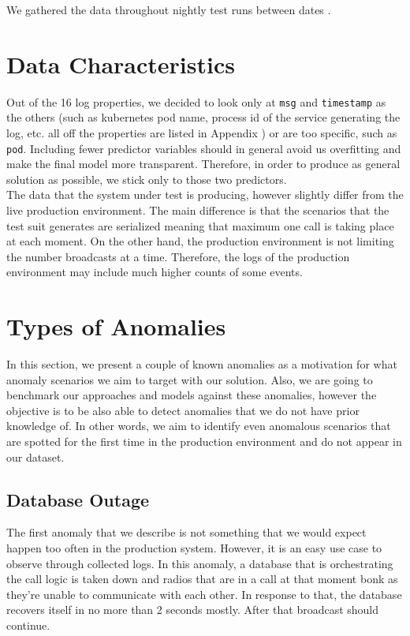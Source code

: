 We gathered the data throughout  nightly test runs between dates .


\section{Data Characteristics}
Out of the 16 log properties, we decided to look only at \texttt{msg} and \texttt{timestamp} as the others (such as kubernetes pod name, process id of the service generating the log, etc. all off the properties are listed in Appendix ) or are too specific, such as \texttt{pod}. 
Including fewer predictor variables should in general avoid us overfitting and make the final model more transparent.
Therefore, in order to produce as general solution as possible, we stick only to those two predictors.\\

The data that the system under test is producing, however slightly differ from the live production environment.
The main difference is that the scenarios that the test suit generates are serialized meaning that maximum one call is taking place at each moment.
On the other hand, the production environment is not limiting the number broadcasts at a time. Therefore, the logs of the production environment may include much higher counts of some events. \\

\section{Types of Anomalies}
In this section, we present a couple of known anomalies as a motivation for what anomaly scenarios we aim to target with our solution.
Also, we are going to benchmark our approaches and models against these anomalies, however the objective is to be also able to detect anomalies that we do not have prior knowledge of. 
In other words, we aim to identify even anomalous scenarios that are spotted for the first time in the production environment and do not appear in our dataset.


\subsection{Database Outage}
The first anomaly that we describe is not something that we would expect happen too often in the production system. 
However, it is an easy use case to observe through collected logs. 
In this anomaly, a database that is orchestrating the call logic is taken down and radios that are in a call at that moment bonk as they're unable to communicate with each other. 
In response to that, the database recovers itself in no more than 2 seconds mostly. After that broadcast should continue.

